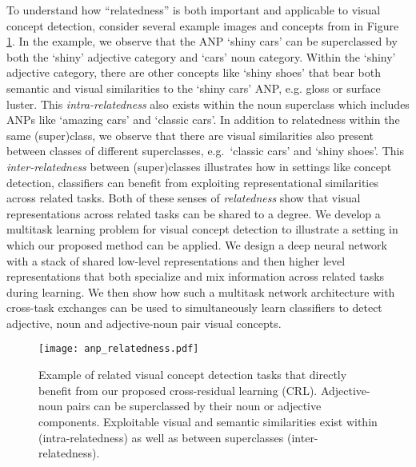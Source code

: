 \documentclass{sig-alternate-05-2015}
\begin{document}
To understand how ``relatedness'' is both important and applicable to visual concept detection, consider several example images and concepts from \cite{borth_2013} in Figure \ref{fig:anp_relatedness}.
In the example, we observe that the ANP `shiny cars' can be superclassed by both the `shiny' adjective category and `cars' noun category.
Within the `shiny' adjective category, there are other concepts like `shiny shoes' that bear both semantic and visual similarities to the `shiny cars' ANP, e.g. gloss or surface luster.
This \emph{intra-relatedness} also exists within the noun superclass which includes ANPs like `amazing cars' and `classic cars'.
In addition to relatedness within the same (super)class, we observe that there are visual similarities also present between classes of different superclasses, e.g.~`classic cars' and `shiny shoes'.
This \emph{inter-relatedness} between (super)classes illustrates how in settings like concept detection, classifiers can benefit from exploiting representational similarities across related tasks.
Both of these senses of \emph{relatedness} show that visual representations across related tasks can be shared to a degree.
We develop a multitask learning problem for visual concept detection to illustrate a setting in which our proposed method can be applied.
We design a deep neural network with a stack of shared low-level representations and then higher level representations that both specialize and mix information across related tasks during learning.
We then show how such a multitask network architecture with cross-task exchanges can be used to simultaneously learn classifiers to detect adjective, noun and adjective-noun pair visual concepts.

\begin{figure}[t]
  \centering
  \texttt{[image: anp\_relatedness.pdf]}
  \caption{Example of related visual concept detection tasks that directly benefit from our proposed cross-residual learning (CRL). Adjective-noun pairs can be superclassed by their noun or adjective components. Exploitable visual and semantic similarities exist within (intra-relatedness) as well as between superclasses (inter-relatedness).}
  \label{fig:anp_relatedness}
  \vspace{-0.3cm}
\end{figure}
\end{document}
